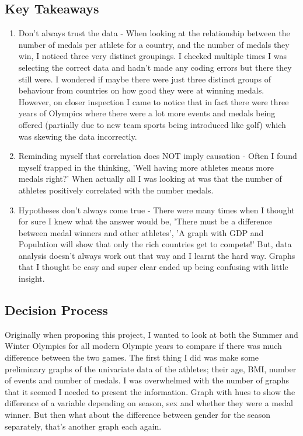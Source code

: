 \documentclass[a4 paper, 12pt]{article}
\begin{document}
        \subsection{Key Takeaways}
            \begin{enumerate}
                \item Don't always trust the data - When looking at the relationship between the number of medals per athlete for a country, and the number of medals they win, I noticed three very distinct groupings. I checked multiple times I was selecting the correct data and hadn't made any coding errors but there they still were. I wondered if maybe there were just three distinct groups of behaviour from countries on how good they were at winning medals. However, on closer inspection I came to notice that in fact there were three years of Olympics where there were a lot more events and medals being offered (partially due to new team sports being introduced like golf) which was skewing the data incorrectly.
                \item Reminding myself that correlation does NOT imply causation - Often I found myself trapped in the thinking, 'Well having more athletes means more medals right?' When actually all I was looking at was that the number of athletes positively correlated with the number medals.
                \item Hypotheses don't always come true - There were many times when I thought for sure I knew what the answer would be, 'There must be a difference between medal winners and other athletes', 'A graph with GDP and Population will show that only the rich countries get to compete!' But, data analysis doesn't always work out that way and I learnt the hard way. Graphs that I thought be easy and super clear ended up being confusing with little insight.
            \end{enumerate}

            \subsection{Decision Process}
            Originally when proposing this project, I wanted to look at both the Summer and Winter Olympics for all modern Olympic years to compare if there was much difference between the two games. The first thing I did was make some preliminary graphs of the univariate data of the athletes; their age, BMI, number of events and number of medals. I was overwhelmed with the number of graphs that it seemed I needed to present the information. Graph with hues to show the difference of a variable depending on season, sex and whether they were a medal winner. But then what about the difference between gender for the season separately, that's another graph each again. 
            
\end{document}
